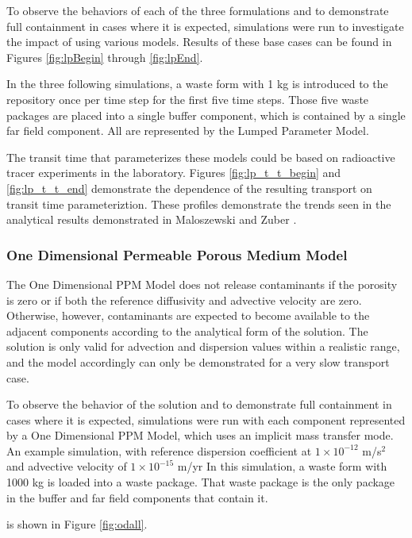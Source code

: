 To observe the behaviors of each of the three formulations and to demonstrate 
full containment in cases where it is expected, simulations were run to 
investigate the impact of using various models. Results of these base cases can be found in Figures 
\ref{fig:lpBegin} through \ref{fig:lpEnd}.

In the three following simulations, a waste form with 1 kg is introduced to the repository once 
per time step for the first five time steps. Those five waste packages are 
placed into a single buffer component, which is contained by a single far field 
component. All are represented by the Lumped Parameter Model.



The transit time that parameterizes these models could be based on radioactive 
tracer experiments in the laboratory. Figures \ref{fig:lp_t_t_begin} 
and \ref{fig:lp_t_t_end} demonstrate the dependence of the resulting transport on 
transit time parameteriztion. These profiles demonstrate the trends seen in the 
analytical results demonstrated in Maloszewski and Zuber 
\cite{maloszewski_lumped_1996}.



\subsubsection{One Dimensional Permeable Porous Medium Model}
The One Dimensional PPM Model does not release contaminants if the porosity is 
zero or if both the reference diffusivity and advective velocity are zero. 
Otherwise, however, contaminants are expected to  become available to the adjacent 
components according to the analytical form of the solution. The solution is 
only valid for advection and dispersion values within a realistic range, and 
the model accordingly can only be demonstrated for a very slow transport case. 

To observe the behavior of the solution and to demonstrate full containment in 
cases where it is expected, simulations were run with each component represented 
by a One Dimensional PPM Model, which uses an implicit mass transfer mode. An 
example simulation, with reference dispersion coefficient at $1\times 10^{-12}$ 
m/s$^2$ and advective velocity of $1\times 10^{-15}$ m/yr 
In this simulation, a waste form with 1000 kg 
is loaded into a waste package. That waste package is the only package in the 
buffer and far field components that contain it.


\FloatBarrier
is shown in Figure \ref{fig:odall}. 
